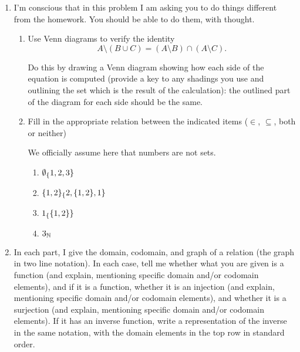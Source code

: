 \documentclass[12pt]{article}
\begin{document}
\begin{enumerate}
\newpage

\item  I'm conscious that in this problem I am asking you to do things different from the homework.  You should be able to do them, with thought.

\begin{enumerate}
\item  Use Venn diagrams to verify the identity $$A \setminus (B \cup C) = (A \setminus B) \cap (A \setminus C).$$

Do this by drawing a Venn diagram showing how each side of the equation is computed (provide a key to any shadings you use and outlining the set which is the result of the calculation):
the outlined part of the diagram for each side should be the same.

\newpage

\item  Fill in the appropriate relation between the indicated items ($\in$, $\subseteq$, both or neither)

We officially assume here that numbers are not sets.

\begin{enumerate}

\item $\emptyset \verb ___ \{1,2,3\}$

\item $\{1,2\} \verb ___ \{2,\{1,2\},1\}$

\item $1 \verb ___ \{\{1,2\}\}$

\item  $3 \verb ___ \mathbb N$

\end{enumerate}

\end{enumerate}

\newpage

\item In each part, I give the domain, codomain, and graph of a relation (the graph in two line notation).  In each case, tell me whether what you are given is a function (and explain, mentioning specific domain and/or codomain elements), and if it is a function, whether it is an injection  (and explain, mentioning specific domain and/or codomain elements), and whether it is a surjection  (and explain, mentioning specific domain and/or codomain elements).  If it has an inverse function, write a representation of the inverse in the same notation, with the domain elements in the top row in standard order.


\end{enumerate}
\end{document}
